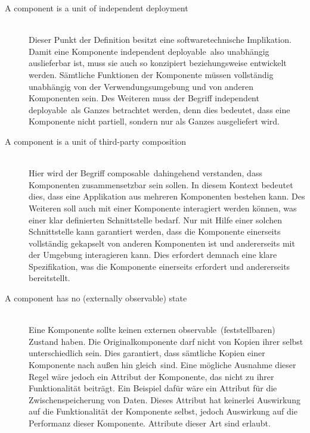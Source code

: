 \begin{description}
\item[A component is a unit of independent deployment] \hfill \\
Dieser Punkt der Definition besitzt eine softwaretechnische Implikation. Damit eine Komponente \glqq independent deployable\grqq\ also unabhängig auslieferbar ist, muss sie auch so konzipiert beziehungsweise entwickelt werden. Sämtliche Funktionen der Komponente müssen vollständig unabhängig von der Verwendungsumgebung und von anderen Komponenten sein. Des Weiteren muss der Begriff \glqq independent deployable\grqq\ als Ganzes betrachtet werden, denn dies bedeutet, dass eine Komponente nicht partiell, sondern nur als Ganzes ausgeliefert wird.
\item[A component is a unit of third-party composition] \hfill \\
Hier wird der Begriff \glqq composable\grqq\ dahingehend verstanden, dass Komponenten zusammensetzbar sein sollen. In diesem Kontext bedeutet dies, dass eine Applikation aus mehreren Komponenten bestehen kann. Des Weiteren soll auch mit einer Komponente interagiert werden können, was einer klar definierten Schnittstelle bedarf. Nur mit Hilfe einer solchen Schnittstelle kann garantiert werden, dass die Komponente einerseits vollständig gekapselt von anderen Komponenten ist und andererseits mit der Umgebung interagieren kann. Dies erfordert demnach eine klare Spezifikation, was die Komponente einerseits erfordert und andererseits bereitstellt.
\item[A component has no (externally observable) state] \hfill \\
Eine Komponente sollte keinen externen \glqq observable\grqq\ (feststellbaren) Zustand haben. Die Originalkomponente darf nicht von Kopien ihrer selbst unterschiedlich sein. Dies garantiert, dass sämtliche Kopien einer Komponente nach außen hin \glqq gleich\grqq\ sind.
Eine mögliche Ausnahme dieser Regel wäre jedoch ein Attribut der Komponente, das nicht zu ihrer Funktionalität beiträgt. Ein Beispiel dafür wäre ein Attribut für die Zwischenspeicherung von Daten. Dieses Attribut hat keinerlei Auswirkung auf die Funktionalität der Komponente selbst, jedoch Auswirkung auf die Performanz dieser Komponente. Attribute dieser Art sind erlaubt.
\end{description}

